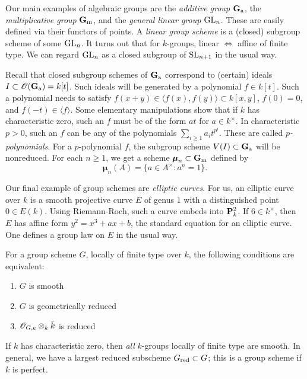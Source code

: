 \documentclass{article}
\begin{document}
Our main examples of algebraic groups are the \emph{additive group} 
$\mathbf{G}_{\mathrm{a}}$, the \emph{multiplicative group} $\mathbf{G}_{\mathrm{m}}$, and the 
\emph{general linear group} $\operatorname{GL}_n$. These are easily defined 
via their functors of points. A \emph{linear group scheme} is a (closed) 
subgroup scheme of some $\operatorname{GL}_n$. It turns out that for 
$k$-groups, linear $\Leftrightarrow$ affine of finite type. We can regard 
$\operatorname{GL}_n$ as a closed subgroup of $\operatorname{SL}_{n+1}$ in the 
usual way. 

Recall that closed subgroup schemes of $\mathbf{G}_{\mathrm{a}}$ correspond to 
(certain) 
ideals $I\subset \mathscr{O}(\mathbf{G}_{\mathrm{a}}) = k[t]$. Such ideals will be 
generated by a polynomial $f\in k[t]$. Such a polynomial needs to 
satisfy $f(x+y) \in \langle f(x),f(y)\rangle \subset k[x,y]$, 
$f(0)=0$, and $f(-t) \in \langle f\rangle$. Some elementary manipulations 
show that if $k$ has characteristic zero, such an $f$ must be of the 
form $a t$ for $a\in k^\times$. In characteristic $p>0$, such an $f$ can 
be any of the polynomials $\sum_{i\geqslant 1} a_i t^{p^i}$. These are 
called \emph{$p$-polynomials}. For a $p$-polynomial $f$, the subgroup 
scheme $V(I)\subset \mathbf{G}_{\mathrm{a}}$ will be nonreduced. For each 
$n\geqslant 1$, we get a scheme $\boldsymbol\mu_n\subset \mathbf{G}_{\mathrm{m}}$ defined 
by 
\[
  \boldsymbol\mu_n(A) = \{a\in A^\times:a^n=1\} .
\]

Our final example of group schemes are \emph{elliptic curves}. For us, 
an elliptic curve over $k$ is a smooth projective curve $E$ of genus $1$ 
with a distinguished point $0\in E(k)$. Using Riemann-Roch, such a curve 
embeds into $\mathbf{P}_k^2$. If $6\in k^\times$, then 
$E$ has affine form $y^2=x^3+a x+b$, the standard equation for an elliptic 
curve. One defines a group law on $E$ in the usual way. 

For a group scheme $G$, locally of finite type over $k$, the following 
conditions are equivalent:
\begin{enumerate}
  \item $G$ is smooth
  \item $G$ is geometrically reduced
  \item $\mathscr{O}_{G,e}\otimes_k \bar k$ is reduced
\end{enumerate}
If $k$ has characteristic zero, then \emph{all} $k$-groups locally of 
finite type are smooth. In general, we have a largest reduced 
subscheme $G_{\mathrm{red}}\subset G$; this is a group scheme if $k$ is 
perfect. 
\end{document}
